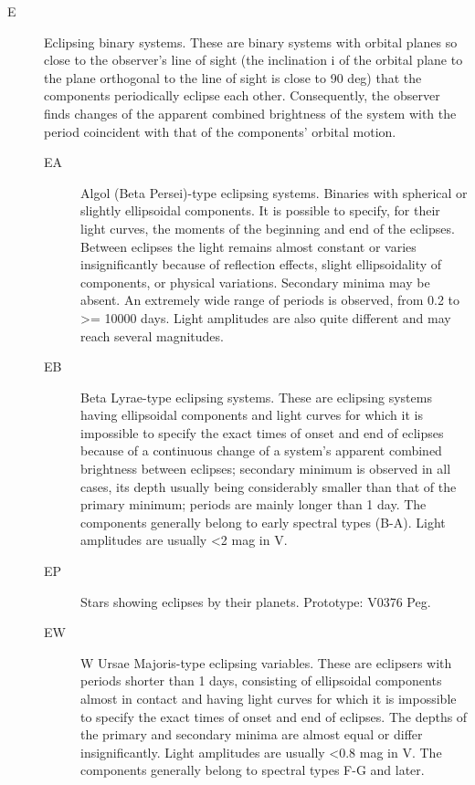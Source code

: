 \begin{description}
\item[E]      Eclipsing binary systems. These are binary systems with
              orbital planes so close to the observer's line of sight (the inclination
              i of the orbital plane to the plane orthogonal to the line of sight is
              close to 90 deg) that the components periodically eclipse each other.
              Consequently, the observer finds changes of the apparent combined
              brightness of the system with the period coincident with that of the
              components' orbital motion.
	\begin{description}
\item[EA]     Algol (Beta Persei)-type eclipsing systems. Binaries with
              spherical or slightly ellipsoidal components. It is possible to specify,
              for their light curves, the moments of the beginning and end of the
              eclipses. Between eclipses the light remains almost constant or varies
              insignificantly because of reflection effects, slight ellipsoidality of
              components, or physical variations. Secondary minima may be absent. An
              extremely wide range of periods is observed, from 0.2 to \textgreater{}=
              10000 days. Light amplitudes are also quite different and may reach
              several magnitudes.
\item[EB]     Beta Lyrae-type eclipsing systems. These are eclipsing
              systems having ellipsoidal components and light curves for which it is
              impossible to specify the exact times of onset and end of eclipses
              because of a continuous change of a system's apparent combined
              brightness between eclipses; secondary minimum is observed in all cases,
              its depth usually being considerably smaller than that of the primary
              minimum; periods are mainly longer than 1 day. The components generally
              belong to early spectral types (B-A). Light amplitudes are usually
              \textless{}2 mag in V.
\item[EP]     Stars showing eclipses by their planets. Prototype: V0376 Peg.
\item[EW]     W Ursae Majoris-type eclipsing variables. These are
              eclipsers with periods shorter than 1 days, consisting of ellipsoidal
              components almost in contact and having light curves for which it is
              impossible to specify the exact times of onset and end of eclipses. The
              depths of the primary and secondary minima are almost equal or differ
              insignificantly. Light amplitudes are usually \textless{}0.8 mag in V.
              The components generally belong to spectral types F-G and
              later.
	\end{description}
\end{description}

